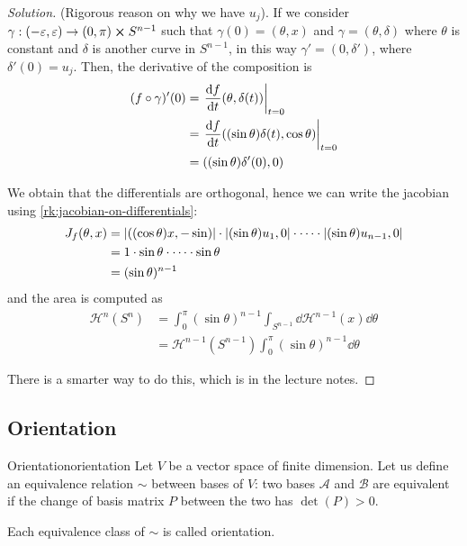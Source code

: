 \documentclass[12pt]{extarticle}
\begin{document}
\begin{proof}[Solution]
	(Rigorous reason on why we have $u_j$). If we consider
	$\gamma: (-\varepsilon, \varepsilon) \to (0, \pi) \cross S^{n-1}$ such that
	$\gamma(0) = (\theta, x)$ and $\gamma = (\theta, \delta)$ where $\theta$ is constant and $\delta$
	is another curve in $S^{n-1}$, in this way $\gamma' = (0, \delta')$, where $\delta'(0) = u_j$.
	Then, the derivative of the composition is
	\begin{align}
		(f \circ \gamma)' (0) & = \eval{\dv{f}{t}{} (\theta, \delta(t))}_{t = 0}                    \\
		                      & = \eval{\dv{f}{t}{} ((\sin \theta) \delta(t), \cos \theta)}_{t = 0} \\
		                      & = ((\sin \theta) \delta'(0), 0)
	\end{align}

	We obtain that the differentials are orthogonal, hence we can write the jacobian using
	\cref{rk:jacobian-on-differentials}:
	\begin{align}
		J_f(\theta, x) & = \abs{((\cos \theta) x, -\sin)} \cdot \abs{(\sin \theta)u_1, 0} \cdot \dots
		\cdot \abs{(\sin \theta) u_{n-1}, 0}                                                          \\
		               & = 1 \cdot \sin \theta \cdot \dots \cdot \sin \theta                          \\
		               & = (\sin \theta)^{n-1}
	\end{align}
	and the area is computed as
	\begin{align}
		\mathcal H^n(S^n) & = \int_0^\pi (\sin \theta)^{n-1} \int_{S^{n-1}} \dd \mathcal H^{n-1}(x) \dd \theta \\
		                  & = \mathcal H^{n-1}(S^{n-1}) \int_0^\pi (\sin \theta)^{n-1} \dd \theta
	\end{align}

	There is a smarter way to do this, which is in the lecture notes.
\end{proof}

\subsection{Orientation}

\begin{definition}{Orientation}{orientation}
	Let $V$ be a vector space of finite dimension.
	Let us define an equivalence relation $\sim$ between bases of $V$: two bases $\mathcal A$ and
	$\mathcal B$ are equivalent if the change of basis matrix $P$ between the two has $\det(P) > 0$.

	Each equivalence class of $\sim$ is called orientation.
\end{definition}
\end{document}
